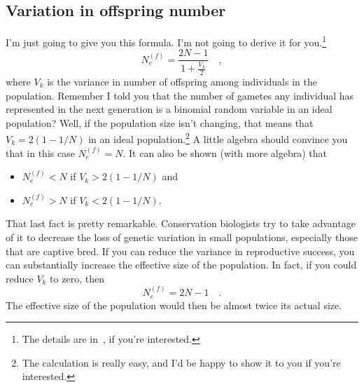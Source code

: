 \subsection*{Variation in offspring number}

I'm just going to give you this formula. I'm not going to derive it
for you.\footnote{The details are in~\cite{Crow-Kimura-1970}, if
  you're interested.}
\[
N_e^{(f)} = \frac{2N - 1}{1 + \frac{V_k}{2}} \quad ,
\]
where $V_k$ is the variance in number of offspring among individuals
in the population.  Remember I told you that the number of gametes any
individual has represented in the next generation is a binomial random
variable in an ideal population? Well, if the population size isn't
changing, that means that $V_k = 2(1 - 1/N)$ in an ideal
population.\footnote{The calculation is really easy, and I'd be happy
  to show it to you if you're interested.} A little algebra should
convince you that in this case $N_e^{(f)} = N$. It can also be shown
(with more algebra) that

\begin{itemize}

\item $N_e^{(f)} < N$ if $V_k > 2(1 - 1/N)$ and

\item $N_e^{(f)} > N$ if $V_k < 2(1 - 1/N)$.

\end{itemize}

\noindent That last fact is pretty remarkable. Conservation biologists
try to take advantage of it to decrease the loss of genetic variation
in small populations, especially those that are captive bred. If you
can reduce the variance in reproductive success, you can substantially
increase the effective size of the population. In fact, if you could
reduce $V_k$ to zero, then
\[
N_e^{(f)} = 2N - 1 \quad .
\]
The effective size of the population would then be almost twice its
actual size.

